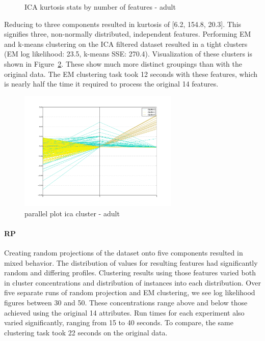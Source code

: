 \documentclass{sig-alternate}
\begin{document}
\begin{figure}[!htbp]
    \centering
    \theverbbox
    \caption{ICA kurtosis stats by number of features - adult\label{ica-stats-adult}}
\end{figure}

Reducing to three components resulted in kurtosis of [6.2, 154.8, 20.3]. This signifies three, non-normally distributed, independent features. Performing EM and k-means clustering on the ICA filtered dataset resulted in a tight clusters (EM log likelihood: 23.5, k-means SSE: 270.4). Visualization of these clusters is shown in Figure~\ref{parallel-ica-cluster}. These show much more distinct groupings than with the original data. The EM clustering task took 12 seconds with these features, which is nearly half the time it required to process the original 14 features.

\begin{figure}[!htbp]
    \centering
    \includegraphics[width=3in]{part2/adult/parallel-ica-cluster.pdf}
    \caption{parallel plot ica cluster - adult\label{parallel-ica-cluster}}
\end{figure} 

\paragraph{RP}

Creating random projections of the dataset onto five components resulted in mixed behavior. The distribution of values for resulting features had significantly random and differing profiles. Clustering results using those features varied both in cluster concentrations and distribution of instances into each distribution. Over five separate runs of random projection and EM clustering, we see log likelihood figures between 30 and 50. These concentrations range above and below those achieved using the original 14 attributes. Run times for each experiment also varied significantly, ranging from 15 to 40 seconds. To compare, the same clustering task took 22 seconds on the original data.
\end{document}
